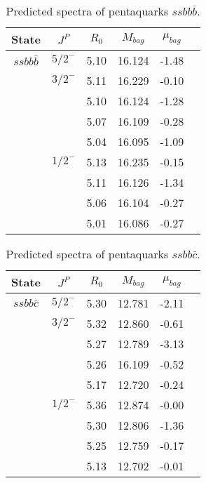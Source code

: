 \documentclass[prd,twocolumn,floatfix,nofootinbib]{revtex4}
\begin{document}
\begin{table*}[!htbp]
    \caption{Predicted spectra of pentaquarks $ssbb\bar{b}$.}
    \begin{tabular}{cccccc}
        \hline\hline
        {\rm State} &$J^{P}$ &$R_{0}$ &$M_{bag}$ &$\mu_{bag}$  \\ \hline
        $ssbb\bar{b}$
            &${5/2}^{-}$     &5.10   &16.124 &-1.48  \\                
            &${3/2}^{-}$     &5.11   &16.229 &-0.10 \\
                         &$ $     &5.10   &16.124 &-1.28  \\
                         &$ $     &5.07   &16.109 &-0.28  \\
                         &$ $     &5.04   &16.095 &-1.09 \\
            &${1/2}^{-}$     &5.13   &16.235 &-0.15  \\
                         &$ $     &5.11   &16.126 &-1.34  \\
                         &$ $     &5.06   &16.104 &-0.27  \\
                         &$ $     &5.01   &16.086 &-0.27 \\
       \hline\hline
    \end{tabular}
\end{table*}

\begin{table*}[!htbp]
    \caption{Predicted spectra of pentaquarks $ssbb\bar{c}$.}
    \begin{tabular}{cccccc}
        \hline\hline
        {\rm State} &$J^{P}$ &$R_{0}$ &$M_{bag}$ &$\mu_{bag}$  \\ \hline
        $ssbb\bar{c}$
            &${5/2}^{-}$     &5.30   &12.781 &-2.11  \\                
            &${3/2}^{-}$     &5.32   &12.860 &-0.61 \\
                         &$ $     &5.27   &12.789 &-3.13  \\
                         &$ $     &5.26   &16.109 &-0.52  \\
                         &$ $     &5.17   &12.720 &-0.24 \\
            &${1/2}^{-}$     &5.36   &12.874 &-0.00  \\
                         &$ $     &5.30   &12.806 &-1.36  \\
                         &$ $     &5.25   &12.759 &-0.17  \\
                         &$ $     &5.13   &12.702 &-0.01 \\
       \hline\hline
    \end{tabular}
\end{table*}
\end{document}
